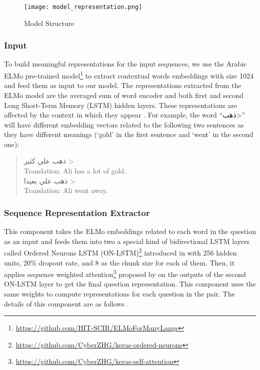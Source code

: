 \documentclass[11pt,a4paper]{article}
\begin{document}
\begin{figure*}
    \centering
    \texttt{[image: model\_representation.png]}
    \caption{Model Structure}
    \label{model_representation}
\end{figure*}

\subsubsection{Input}

To build meaningful representations for the input sequences, we use the Arabic ELMo pre-trained model\footnote{\url{https://github.com/HIT-SCIR/ELMoForManyLangs}}
to extract contextual words embeddings with size 1024 and feed them as input to our model. The representations extracted from the ELMo model are the averaged sum of word encoder and both first and second Long Short-Term Memory (LSTM) hidden layers. These representations are affected by the context in which they appear \cite{cheng2015contextual,peters2018deep,smith2019contextual}. For example, the word ``\<ذهب>'' will have different embedding vectors related to the following two sentences as they have different meanings (`gold' in the first sentence and `went' in the second one):
\begin{quote}
\centering
\<
ذهب علي كثير
> \\
Translation: Ali has a lot of gold. \\
\<
ذهب علي بعيدا
> \\
Translation: Ali went away.
\end{quote}

\subsubsection{Sequence Representation Extractor}

This component takes the ELMo embeddings related to each word in the question as an input and feeds them into two a special kind of bidirectional LSTM layers called Ordered Neurons LSTM (ON-LSTM)\footnote{\url{https://github.com/CyberZHG/keras-ordered-neurons}} introduced in \cite{shen2018ordered} with 256 hidden units, 20\% dropout rate, and 8 as the chunk size for each of them. Then, it applies sequence weighted attention\footnote{\url{https://github.com/CyberZHG/keras-self-attention}} proposed by \cite{felbo2017using} on the outputs of the second ON-LSTM layer to get the final question representation. This component uses the same weights to compute representations for each question in the pair. The details of this component are as follows \cite{shen2018ordered}.
\end{document}
